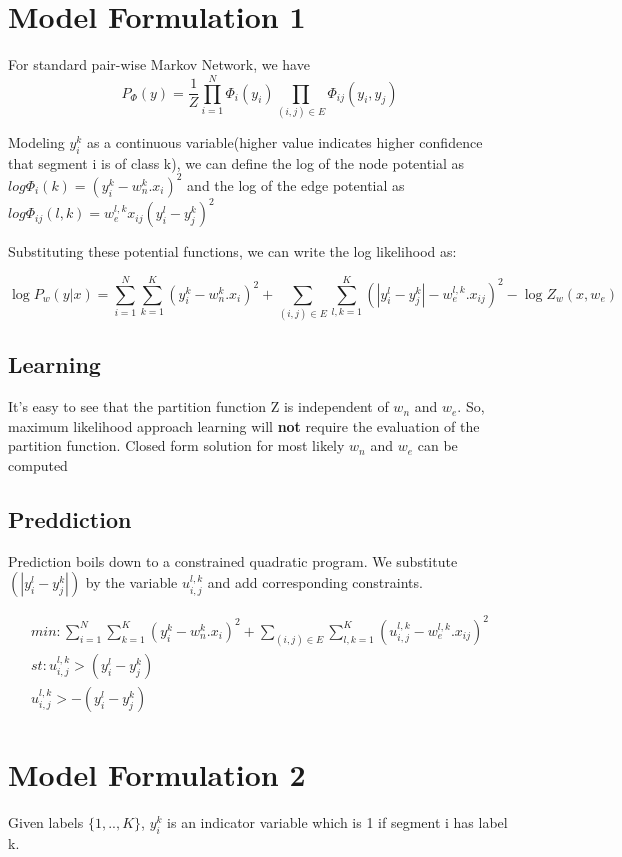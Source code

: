 \documentclass[11pt,a4paper,oneside]{report}
\begin{document}
\section{Model Formulation 1}
For standard pair-wise Markov Network, we have 
\begin{equation}
  P_\Phi (y) = \frac{1}{Z} \prod_{i=1}^{N} \Phi_i(y_i) \prod_{(i,j)\in E} \Phi_{ij}(y_i,y_j)
  \end{equation}

Modeling $y_i^k$ as a continuous variable(higher value indicates higher confidence that segment i is of class k), we can define the log of the node potential as 
$ log \Phi_i(k) = (y_i^k -  w_n^k.x_i )^2$  and the log of the edge potential as $ log \Phi_{ij}(l,k) = w_e^{l,k}x_{ij} ( y_i^l -  y_j^k)^2$

Substituting these potential functions, we can write the log likelihood as: 

\begin{equation}
 \log P_w (y|x) = \sum_{i=1}^{N} \sum_{k=1}^{K} (y_i^k - w^{k}_{n}.x_{i})^2 + \sum_{(i,j)\in E} \sum_{l,k=1}^{K} (|y_i^l - y_j^k| -w_{e}^{l,k}.x_{ij})^2- \log Z_w(x,w_e)
\end{equation}

\subsection{Learning}
It's easy to see that the partition function Z is independent of $w_n$ and $w_e$.
So, maximum likelihood approach learning will {\bf not} require the evaluation of the partition function. Closed form
solution for most likely $w_n$ and $w_e$ can be computed

\subsection{Preddiction}
Prediction boils down to a constrained quadratic program. We substitute $(|y_i^l - y_j^k|)$ by the variable $u_{i,j}^{l,k}$ and add corresponding constraints.

\begin{eqnarray*}
 min: \sum_{i=1}^{N} \sum_{k=1}^{K} (y_i^k - w^{k}_{n}.x_{i})^2 + \sum_{(i,j)\in E} \sum_{l,k=1}^{K} (u_{i,j}^{l,k} -w_{e}^{l,k}.x_{ij})^2\\
 st:u_{i,j}^{l,k}>(y_i^l - y_j^k)\\
 u_{i,j}^{l,k}>-(y_i^l - y_j^k)
\end{eqnarray*}


\section{Model Formulation 2}
Given labels $\{1,.., K\}$, $y_i^k$ is an indicator variable which is 1 if segment i has label k. 
\end{document}
